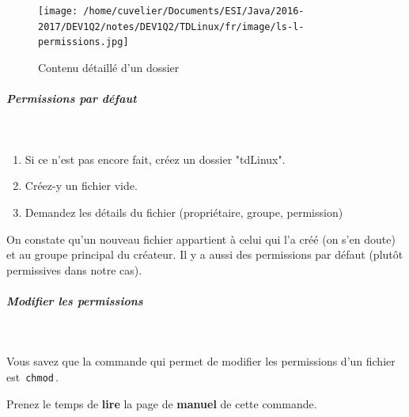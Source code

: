 \documentclass[11pt,a4paper]{article}
\begin{document}
            \par
        \begin{figure}[hbt]
				    \begin{center}
					\texttt{[image: /home/cuvelier/Documents/ESI/Java/2016-2017/DEV1Q2/notes/DEV1Q2/TDLinux/fr/image/ls-l-permissions.jpg]}
						\end{center}
                
                    \caption[Contenu d\'etaill\'e d'un dossier]{Contenu d\'etaill\'e d'un dossier}
                \end{figure}
                    \clearpage
			
		\subparagraph{Permissions par d\'efaut} 
		
					\textcolor{white}{.} \par
				
            \par
        
					\begin{enumerate}
				
			\item Si ce n'est pas encore fait, cr\'eez un dossier "tdLinux".
			\item Cr\'eez-y un fichier vide.
			\item Demandez les d\'etails du fichier (propri\'etaire, groupe, permission)
					\end{enumerate}
				 
					On constate qu'un nouveau fichier appartient \`a celui qui l'a cr\'e\'e 
					(on s'en doute) et au groupe principal du cr\'eateur. 
					Il y a aussi des permissions par d\'efaut (plut\^ot permissives dans notre cas).  
				
            \par
        
			
		\subparagraph{Modifier les permissions} 
		
					\textcolor{white}{.} \par
				
            \par
          
					Vous savez que la commande qui permet de modifier les permissions d'un fichier est 
					\,\verb|chmod|\,.  
				
            \par
          
					Prenez le temps de \textbf{lire} 
					la page de \textbf{manuel} de cette commande.   
				
            \par
        
\end{document}
